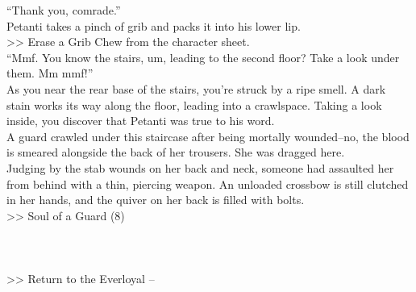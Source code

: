 “Thank you, comrade.”\\

Petanti takes a pinch of grib and packs it into his lower lip.\\
>> Erase a Grib Chew from the character sheet.\\

“Mmf. You know the stairs, um, leading to the second floor? Take a look under them. Mm mmf!”\\

As you near the rear base of the stairs, you’re struck by a ripe smell. A dark stain works its way along the floor, leading into a crawlspace. Taking a look inside, you discover that Petanti was true to his word.\\

A guard crawled under this staircase after being mortally wounded--no, the blood is smeared alongside the back of her trousers. She was dragged here.\\

Judging by the stab wounds on her back and neck, someone had assaulted her from behind with a thin, piercing weapon. An unloaded crossbow is still clutched in her hands, and the quiver on her back is filled with bolts.\\
>> Soul of a Guard (8)\\
\\
\\
\\

>> Return to the Everloyal -- 